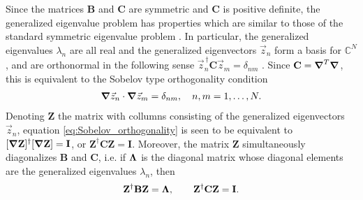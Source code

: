 \documentclass[11pt]{amsart}
\newcommand{\Ib}{\mathbf{I}}
\newcommand{\Bb}{\mathbf{B}}
\newcommand{\Cb}{\mathbf{C}}
\newcommand{\Zb}{\mathbf{Z}}
\newcommand\bLambda{\mbox{\boldmath${\Lambda}$}}
\newcommand\Bnabla{\mbox{\boldmath${\nabla}$}}
\begin{document}
Since the matrices $\Bb$ and $\Cb$ are symmetric and $\Cb$ is
positive definite, the generalized eigenvalue problem has properties
which are similar to those of the standard symmetric eigenvalue
problem \cite{Parlett:1980}. In particular, the generalized
eigenvalues $\lambda_n$ are all real and the generalized eigenvectors
$\vec{z}_n$ form a basis for $\mathbb{C}^N$, and are orthonormal in
the following sense $\vec{z}_n^{\,\dagger}\Cb\vec{z}_m=\delta_{nm}$
\cite{Parlett:1980}. Since $\Cb=\Bnabla^T\Bnabla$, this is equivalent
to the Sobelov type orthogonality condition  
%
\begin{align}\label{eq:Sobelov_orthogonality}
  \Bnabla\vec{z}_n\cdot\Bnabla\vec{z}_m=\delta_{nm}, \quad
  n,m=1,\ldots,N.
\end{align}
%
Denoting $\Zb$ the matrix with collumns consisting of the generalized
eigenvectors $\vec{z}_n$, equation \eqref{eq:Sobelov_orthogonality} is
seen to be equivalent to $[\Bnabla\Zb]^\dagger[\Bnabla\Zb]=\Ib$, or
$\Zb^\dagger\Cb\Zb=\Ib$. Moreover, the matrix $\Zb$ simultaneously
diagonalizes $\Bb$ and $\Cb$, i.e. if $\bLambda$ is the diagonal
matrix whose diagonal elements are the generalized eigenvalues $\lambda_n$,
then \cite{Parlett:1980}
% 
\begin{align}\label{eq:Simultaneous_Diag}
  \Zb^\dagger\Bb\Zb=\bLambda, \qquad
  \Zb^\dagger\Cb\Zb=\Ib.
\end{align}
%
\end{document}
